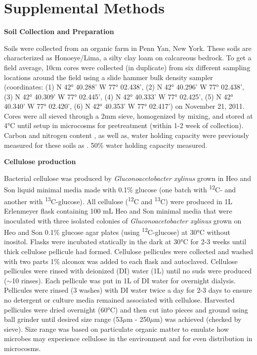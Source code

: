 \section{Supplemental Methods}


\textbf{Soil Collection and Preparation}



Soils were collected from an organic farm in Penn Yan, New York.  These soils are characterized as Honoeye/Lima, a silty clay loam on calcareous bedrock. To get a field average, 10cm cores were collected (in duplicate) from six different sampling locations around the field using a slide hammer bulk density sampler (coordinates: (1) N 42° 40.288’ W 77° 02.438’, (2) N 42° 40.296’ W 77° 02.438’, (3) N 42° 40.309’ W 77° 02.445’, (4) N 42° 40.333’ W 77° 02.425’, (5) N 42° 40.340’ W 77° 02.420’, (6) N 42° 40.353’ W 77° 02.417’) on November 21, 2011.   Cores were all sieved through a 2mm sieve, homogenized by mixing, and stored at 4°C until setup in microcosms for pretreatment (within 1-2 week of collection).  Carbon and nitrogen content , as well as, water holding capacity were previously measured for these soils as .  
50\% water holding capacity measured. 



\textbf{Cellulose production}



Bacterial cellulose was produced by \textit{Gluconoacetobacter xylinus} grown in Heo and Son \cite{Heo_2002} liquid minimal media made with 0.1\% glucose (one batch with \textsuperscript{12}C- and another with \textsuperscript{13}C-glucose). All cellulose (\textsuperscript{12}C and \textsuperscript{13}C) were produced in 1L Erlenmeyer flask containing 100 mL Heo and Son minimal media that were inoculated with three isolated colonies of \textit{Gluconoacetobacter xylinus} grown on Heo and Son 0.1\% glucose agar plates (using \textsuperscript{12}C-glucose) at 30°C without inositol. Flasks were incubated statically in the dark at 30°C for 2-3 weeks until thick cellulose pellicule had formed.  Cellulose pellicules were collected and washed with two parts 1\% alconox was added to each flask and autoclaved. Cellulose pellicules were rinsed with deionized (DI) water (1L) until no suds were produced ($\sim$10 rinses). Each pellicule was put in 1L of DI water for overnight dialysis.  Pellicules were rinsed (3 washes) with DI water twice a day for 2-3 days to ensure no detergent or culture media remained associated with cellulose. Harvested pellicules were dried overnight (60°C) and then cut into pieces and ground using ball grinder until desired size range (53$\mu$m - 250$\mu$m) was achieved (checked by sieve). Size range was based on particulate organic matter to emulate how microbes may experience cellulose in the environment \cite{Cambardella_1992} and for even distribution in microcosms. 

